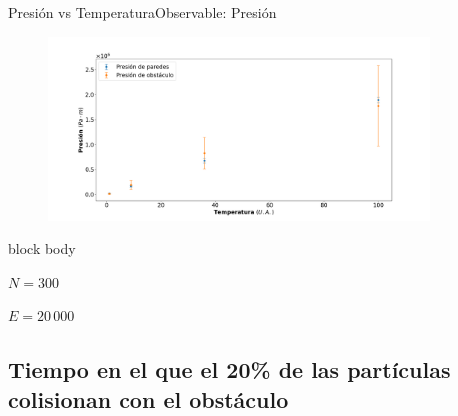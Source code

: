 \documentclass{beamer}
\begin{document}
            \begin{frame}{Presión vs Temperatura}{Observable: Presión}
                \begin{figure}[H!]
                    \includegraphics[width=0.9\textwidth]{./pressure_vs_temperature}
                    \label{fig:p_vs_t}
                \end{figure}
                \begin{beamercolorbox}[sep=5pt,center]{block body}
                    \begin{minipage}[t]{0.3\textwidth}
                        \centering
                        \small{$N=300$}
                    \end{minipage}
                    \hfill
                    \begin{minipage}[t]{0.3\textwidth}
                        \centering
                        \small{$E=20\,000$}
                    \end{minipage}
                \end{beamercolorbox}
            \end{frame}

        \subsection{Tiempo en el que el 20\% de las partículas colisionan con el obstáculo}
\end{document}
